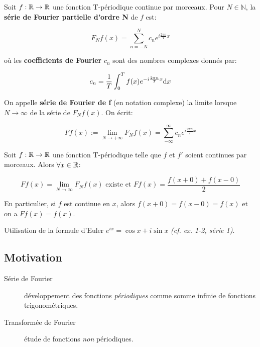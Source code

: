 \begin{definition}[14.2, p.104]
    Soit $f: \mathbb{R} \rightarrow \mathbb{R}$ une fonction T-périodique continue par morceaux.
    Pour $N \in \mathbb{N}$, la \textbf{série de Fourier partielle d'ordre N} de $f$ est:
    
    \[
    F_N f(x) = \sum_{n = -N}^{N} c_n e^{i \frac{2 \pi n}{T} x}
    \]
    
    où les \textbf{coefficients de Fourier} $c_n$ sont des nombres complexes donnés par:
    
    \[
    c_n = \frac{1}{T} \int_{0}^{T} f(x) e^{-i \frac{2 \pi n}{T} x} \mathrm{d}x
    \]
    
    On appelle \textbf{série de Fourier de f} (en notation complexe) la limite lorsque $N \longrightarrow \infty$ de la série de $F_N f(x)$.
    On écrit:
    
    \[ F f(x) := \lim_{N \rightarrow +\infty} F_N f(x) = \sum_{-\infty}^{\infty} c_n e^{i \frac{2 \pi n}{T} x} \]
\end{definition}


\begin{theorem}
    Soit $f: \mathbb{R} \rightarrow \mathbb{R}$ une fonction T-périodique telle que $f$ et $f'$ soient continues par morceaux.
    Alors $\forall x \in \mathbb{R}$:
    
    \[
    F f(x) = \lim\limits_{N \rightarrow \infty} F_N f(x) \textrm{ existe et } F f(x) = \frac{f(x + 0) + f(x - 0)}{2}
    \]
    
    En particulier, si $f$ est continue en $x$, alors $f(x + 0) = f(x - 0) = f(x)$ et on a $F f(x) = f(x)$.
\end{theorem}


\begin{note}
    Utilisation de la formule d'Euler $e^{ix} = \cos x + i \sin x$ \textit{(cf. ex. 1-2, série 1)}.
\end{note}


\subsection{Motivation}

\begin{description}

    \item[Série de Fourier]
    développement des fonctions \textit{périodiques} comme somme infinie de fonctions trigonométriques.
    
    \item[Transformée de Fourier]
    étude de fonctions \textit{non} périodiques.

\end{description}


